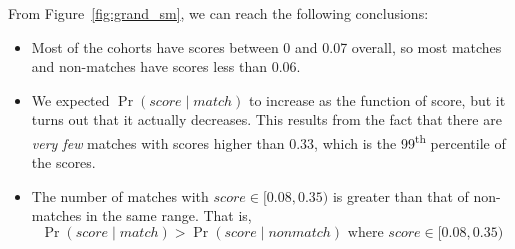 From Figure~\ref{fig:grand_sm}, we can reach the following conclusions:
\begin{itemize}
\item Most of the cohorts have scores between 0 and 0.07 overall, so most matches
and non-matches have scores less than 0.06.
\item We expected $\Pr{(score \mid match)}$ to increase as the function of score,
but it turns out that it actually decreases. This results from the fact that
there are \emph{very few} matches with scores higher than 0.33, which is the
99\textsuperscript{th} percentile of the scores.

\item The number of matches with $score \in [0.08, 0.35)$ is greater than that
of non-matches in the same range. That is, $$\Pr{(score \mid
match)} > \Pr{(score \mid nonmatch)} \mbox{ where } score\in [0.08, 0.35)$$

\end{itemize}

